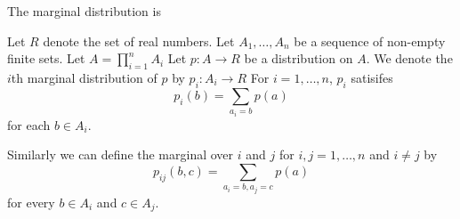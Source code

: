 


The marginal distribution is


Let $R$ denote the set of
real numbers.
Let $A_1, \dots, A_n$ be
a sequence of non-empty finite
sets.
Let $A = \prod_{i = 1}^{n} A_i$
Let $p: A \to R$ be a distribution
on $A$.
We denote the $i$th marginal
distribution of $p$ by $p_i: A_i \to R$
For $i = 1, \dots, n$,
$p_i$ satisifes
\[
  p_i(b) = \sum_{a_i = b} p(a)
\]
for each $b \in A_i$.

Similarly we can define the
marginal over $i$ and $j$
for $i, j = 1, \dots, n$
and $i \neq j$ by
\[
  p_{ij}(b, c) = \sum_{a_i = b, a_j = c} p(a)
\]
for every $b \in A_i$ and $c \in A_j$.
